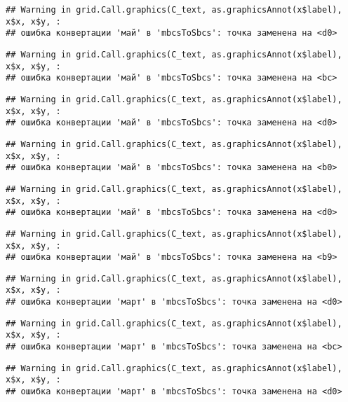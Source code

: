 \documentclass[
]{article}
\begin{document}
\begin{verbatim}
## Warning in grid.Call.graphics(C_text, as.graphicsAnnot(x$label), x$x, x$y, :
## ошибка конвертации 'май' в 'mbcsToSbcs': точка заменена на <d0>
\end{verbatim}

\begin{verbatim}
## Warning in grid.Call.graphics(C_text, as.graphicsAnnot(x$label), x$x, x$y, :
## ошибка конвертации 'май' в 'mbcsToSbcs': точка заменена на <bc>
\end{verbatim}

\begin{verbatim}
## Warning in grid.Call.graphics(C_text, as.graphicsAnnot(x$label), x$x, x$y, :
## ошибка конвертации 'май' в 'mbcsToSbcs': точка заменена на <d0>
\end{verbatim}

\begin{verbatim}
## Warning in grid.Call.graphics(C_text, as.graphicsAnnot(x$label), x$x, x$y, :
## ошибка конвертации 'май' в 'mbcsToSbcs': точка заменена на <b0>
\end{verbatim}

\begin{verbatim}
## Warning in grid.Call.graphics(C_text, as.graphicsAnnot(x$label), x$x, x$y, :
## ошибка конвертации 'май' в 'mbcsToSbcs': точка заменена на <d0>
\end{verbatim}

\begin{verbatim}
## Warning in grid.Call.graphics(C_text, as.graphicsAnnot(x$label), x$x, x$y, :
## ошибка конвертации 'май' в 'mbcsToSbcs': точка заменена на <b9>
\end{verbatim}

\begin{verbatim}
## Warning in grid.Call.graphics(C_text, as.graphicsAnnot(x$label), x$x, x$y, :
## ошибка конвертации 'март' в 'mbcsToSbcs': точка заменена на <d0>
\end{verbatim}

\begin{verbatim}
## Warning in grid.Call.graphics(C_text, as.graphicsAnnot(x$label), x$x, x$y, :
## ошибка конвертации 'март' в 'mbcsToSbcs': точка заменена на <bc>
\end{verbatim}

\begin{verbatim}
## Warning in grid.Call.graphics(C_text, as.graphicsAnnot(x$label), x$x, x$y, :
## ошибка конвертации 'март' в 'mbcsToSbcs': точка заменена на <d0>
\end{verbatim}
\end{document}
